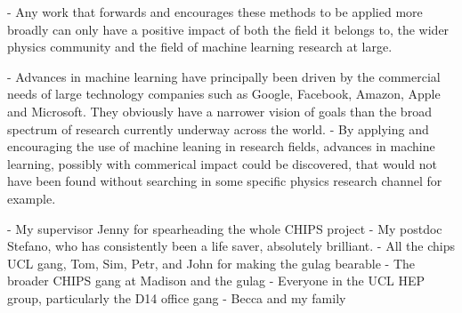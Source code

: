 - Any work that forwards and encourages these methods to be applied more broadly can only have a
positive impact of both the field it belongs to, the wider physics community and the field of
machine learning research at large. 

- Advances in machine learning have principally been driven by the commercial needs of large
technology companies such as Google, Facebook, Amazon, Apple and Microsoft. They obviously have a
narrower vision of goals than the broad spectrum of research currently underway across the world.
- By applying and encouraging the use of machine leaning in research fields, advances in machine
learning, possibly with commerical impact could be discovered, that would not have been found
without searching in some specific physics research channel for example.

\begin{acknowledgements} %
    - My supervisor Jenny for spearheading the whole CHIPS project
    - My postdoc Stefano, who has consistently been a life saver, absolutely brilliant.
    - All the chips UCL gang, Tom, Sim, Petr, and John for making the gulag bearable
    - The broader CHIPS gang at Madison and the gulag
    - Everyone in the UCL HEP group, particularly the D14 office gang 
    - Becca and my family
\end{acknowledgements}

\tableofcontents %